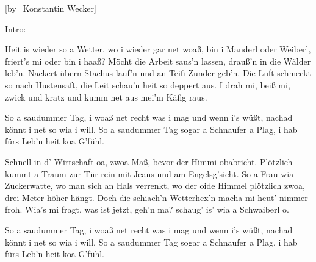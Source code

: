 
[by={Konstantin Wecker}]

\chordson

\beginverse
\nolyrics Intro:
\endverse

\beginverse
Heit is wieder so a Wetter,
wo i wieder gar net woaß,
bin i Manderl oder Weiberl, friert's mi oder bin i haaß?
Möcht die Arbeit saus'n lassen, drauß'n in die Wälder leb'n.
Nackert übern Stachus lauf'n und an Teifi Zunder geb'n.
Die Luft schmeckt so nach Hustensaft, die Leit schau'n heit so deppert aus.
I drah mi, beiß mi, zwick und kratz und kumm net aus mei'm Käfig raus.
\endverse

\beginchorus
So a saudummer Tag,
i woaß net recht was i mag
und wenn i's wüßt, nachad könnt i net so wia i will.
So a saudummer Tag
sogar a Schnaufer a Plag,
i hab fürs Leb'n heit koa G'fühl.
\endchorus

\beginverse
Schnell in d' Wirtschaft oa, zwoa Maß,
bevor der Himmi obabricht.
Plötzlich kummt a Traum zur Tür rein
mit Jeans und am Engelsg'sicht.
So a Frau wia Zuckerwatte, wo man sich an Hals verrenkt,
wo der oide Himmel plötzlich zwoa, drei Meter höher hängt.
Doch die schiach'n Wetterhex'n macha mi heut' nimmer froh.
Wia's mi fragt, was ist jetzt, geh'n ma? schaug' is' wia a Schwaiberl o.
\endverse

\beginchorus
\chordsoff
So a saudummer Tag,
i woaß net recht was i mag
und wenn i's wüßt, nachad könnt i net so wia i will.
So a saudummer Tag
sogar a Schnaufer a Plag,
i hab fürs Leb'n heit koa G'fühl.
\endchorus



\endsong
